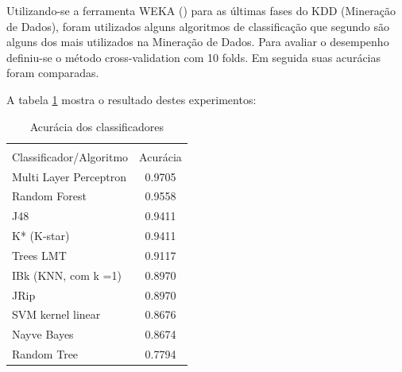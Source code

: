Utilizando-se a ferramenta WEKA (\cite{eibe2016}) para as últimas fases do KDD (Mineração de Dados), foram utilizados alguns algoritmos de classificação que segundo \cite{wu2007} são alguns dos mais utilizados na Mineração de Dados. Para avaliar o desempenho definiu-se o método cross-validation com 10 folds. Em seguida suas acurácias foram comparadas.

A tabela \ref{tab:acuracias} mostra o resultado destes experimentos:

\begin{table}[h!]
	\centering
	\caption{Acurácia dos classificadores}
	\label{tab:acuracias}
	\vspace{0.3cm}
	\begin{tabular}{p{6cm}c}
		\hline\\
		Classificador/Algoritmo& Acurácia  \\[10pt] 
		\hline
		Multi Layer Perceptron & 0.9705    \\
		Random Forest~         & 0.9558    \\
		J48                    & 0.9411    \\
		K* (K-star)            & 0.9411    \\
		Trees LMT              & 0.9117    \\
		IBk (KNN, com k =1)~   & 0.8970    \\
		JRip                   & 0.8970    \\
		SVM kernel linear~     & 0.8676    \\
		Nayve Bayes            & 0.8674    \\
		Random Tree            & 0.7794    \\
		\hline
	\end{tabular}
	\\[6pt]		
\end{table}

